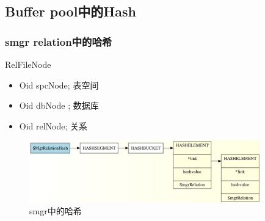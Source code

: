 \documentclass{beamer}
\makeatletter
\newcommand{\tabincell}[2]
{
	\begin{tabular}
	{@{}#1@{}}#2
	\end{tabular}
}
\makeatother
\begin{document}
\begin{CJK*}{UTF8}{gkai}
%
%



\section{Buffer pool中的Hash} 

\begin{frame}
\transdissolve
\frametitle{smgr relation中的哈希}
\begin{exampleblock}{RelFileNode}
\tiny
\begin{itemize}
\item \quad Oid spcNode; 表空间
\item \quad Oid dbNode ; 数据库
\item \quad Oid relNode; 关系
\end{itemize}

\end{exampleblock}

\begin{figure}[!ht]
\centering
\includegraphics[width = 100mm]{smgr.jpg}
\caption{smgr中的哈希}
\label{overflow}
\end{figure}
\end{frame}




\end{CJK*}
\end{document}
